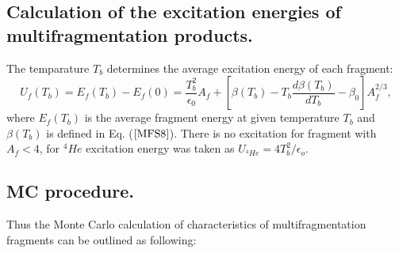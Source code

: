 \subsection{ Calculation of the excitation energies of
multifragmentation products.} 

\hspace{1.0em}The temparature $T_b$ determines the average excitation
energy of each fragment:
\begin{equation}
\label{MFS23} U_{f}(T_b) = E_f(T_b) - E_f(0) =  \frac{T_b^2}{\epsilon_0}A_f +
[\beta(T_b) - T_b \frac{d\beta(T_b)}{dT_b} - \beta_0]A^{2/3}_f,  
\end{equation} 
where $E_f(T_b)$ is the average fragment energy at given temperature
$T_b$ and $\beta(T_b)$ is defined in Eq. ($\ref{MFS8}$).  There is no
excitation for fragment with $A_f < 4$, for $^{4}He$ excitation energy
was taken as $U_{^{4}He} = 4T^2_b/\epsilon_o$.


\subsection{ MC procedure.}

\hspace{1.0em}Thus the Monte Carlo calculation of characteristics of
multifragmentation fragments can be outlined as following:


